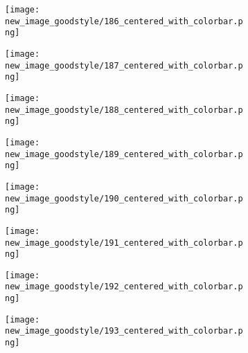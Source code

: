 \documentclass[a4paper,12pt]{article}
\begin{document}
\begin{figure}[H]
  \begin{subfigure}{0.11\textwidth}
    \texttt{[image: new\_image\_goodstyle/186\_centered\_with\_colorbar.png]}
  \end{subfigure}
  \hfill
  \begin{subfigure}{0.11\textwidth}
    \texttt{[image: new\_image\_goodstyle/187\_centered\_with\_colorbar.png]}
  \end{subfigure}
  \hfill
  \begin{subfigure}{0.11\textwidth}
    \texttt{[image: new\_image\_goodstyle/188\_centered\_with\_colorbar.png]}
  \end{subfigure}
  \hfill
  \begin{subfigure}{0.11\textwidth}
    \texttt{[image: new\_image\_goodstyle/189\_centered\_with\_colorbar.png]}
  \end{subfigure}
  \hfill
  \begin{subfigure}{0.11\textwidth}
    \texttt{[image: new\_image\_goodstyle/190\_centered\_with\_colorbar.png]}
  \end{subfigure}
  \hfill
  \begin{subfigure}{0.11\textwidth}
    \texttt{[image: new\_image\_goodstyle/191\_centered\_with\_colorbar.png]}
  \end{subfigure}
  \hfill
  \begin{subfigure}{0.11\textwidth}
    \texttt{[image: new\_image\_goodstyle/192\_centered\_with\_colorbar.png]}
  \end{subfigure}
  \hfill
  \begin{subfigure}{0.11\textwidth}
    \texttt{[image: new\_image\_goodstyle/193\_centered\_with\_colorbar.png]}
  \end{subfigure}
  \hfill
\end{figure}
\end{document}
